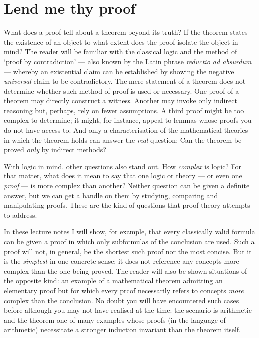 %
\chapter{Lend me thy proof}
%

What does a proof tell about a theorem beyond its truth?
If the theorem states the existence of an object to what extent does the proof isolate the object in mind?
The reader will be familiar with the classical logic and the method of ‘proof by contradiction’ --- also known by the Latin phrase \emph{reductio ad absurdum} --- whereby an existential claim can be established by showing the negative \emph{universal} claim to be contradictory.
The mere statement of a theorem does not determine whether such method of proof is used or necessary.
One proof of a theorem may directly construct a witness.
Another may invoke only indirect reasoning but, perhaps, rely on fewer assumptions.
A third proof might be too complex to determine; it might, for instance, appeal to lemmas whose proofs you do not have access to.
And only a characterisation of the mathematical theories in which the theorem holds can answer the \emph{real} question: Can the theorem be proved \emph{only} by indirect methods?

With logic in mind, other questions also stand out.
How \emph{complex} is logic? 
For that matter, what does it mean to say that one logic or theory --- or even one \emph{proof} --- is more complex than another?
Neither question can be given a definite answer, but we can get a handle on them by studying, comparing and manipulating proofs.
These are the kind of questions that proof theory attempts to address.

In these lecture notes
I will show, for example, that every classically valid formula can be given a proof in which only subformulas of the conclusion are used.
Such a proof will not, in general, be the shortest such proof nor the most concise.
But it is the \emph{simplest} in one concrete sense: it does not reference any concepts more complex than the one being proved.
%
%
The reader will also be shown situations of the opposite kind: an example of a mathematical theorem admitting an elementary proof but for which every proof necessarily refers to concepts \emph{more} complex than the conclusion.
No doubt you will have encountered such cases before although you may not have realised at the time: the scenario is arithmetic and the theorem one of many examples whose proofs (in the language of arithmetic) necessitate a stronger induction invariant than the theorem itself.

